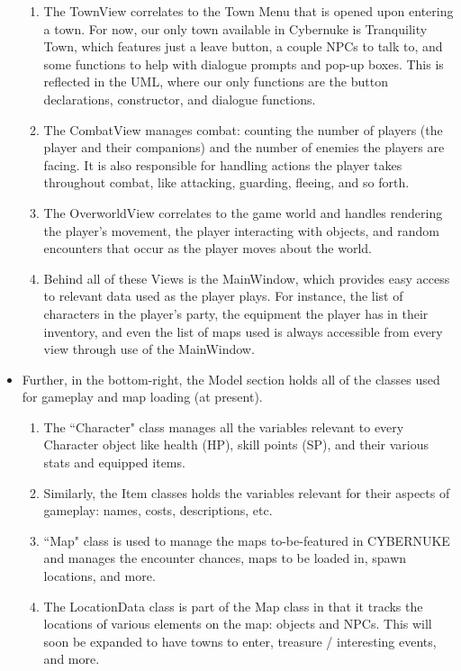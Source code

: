\documentclass[10pt,conference,onecolumn,compsoc]{IEEEtran}
\begin{document}
\begin{itemize}
\begin{enumerate}
	\item The TownView correlates to the Town Menu that is opened upon entering a town. For now, our only town available in Cybernuke is Tranquility Town, which features just a leave button, a couple NPCs to talk to, and some functions to help with dialogue prompts and pop-up boxes. This is reflected in the UML, where our only functions are the button declarations, constructor, and dialogue functions.

	\item The CombatView manages combat: counting the number of players (the player and their companions) and the number of enemies the players are facing. It is also responsible for handling actions the player takes throughout combat, like attacking, guarding, fleeing, and so forth. 

	\item The OverworldView correlates to the game world and handles rendering the player's movement, the player interacting with objects, and random encounters that occur as the player moves about the world.

	\item Behind all of these Views is the MainWindow, which provides easy access to relevant data used as the player plays. For instance, the list of characters in the player's party, the equipment the player has in their inventory, and even the list of maps used is always accessible from every view through use of the MainWindow.
	\end{enumerate} 
	

\item Further, in the bottom-right, the Model section holds all of the classes used for gameplay and map loading (at present). 

	\begin{enumerate}
	\item The ``Character" class manages all the variables relevant to every Character object like health (HP), skill points (SP), and their various stats and equipped items. 
	\item Similarly, the Item classes holds the variables relevant for their aspects of gameplay: names, costs, descriptions, etc. 
	\item ``Map" class is used to manage the maps to-be-featured in CYBERNUKE and manages the encounter chances, maps to be loaded in, spawn locations, and more. 
	\item The LocationData class is part of the Map class in that it tracks the locations of various elements on the map: objects and NPCs. This will soon be expanded to have towns to enter, treasure / interesting events, and more.
	\end{enumerate}
	


\end{itemize}
\end{document}
